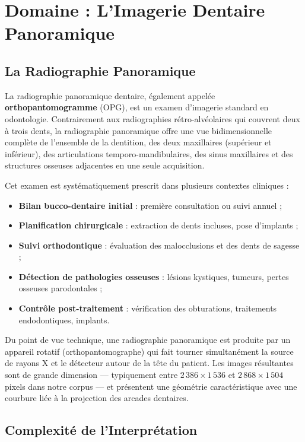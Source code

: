 \documentclass{rapportENSIAS}
\begin{document}
\section{Domaine : L'Imagerie Dentaire Panoramique}

\subsection{La Radiographie Panoramique}

La radiographie panoramique dentaire, également appelée \textbf{orthopantomogramme} (OPG), est un examen d'imagerie standard en odontologie. Contrairement aux radiographies rétro-alvéolaires qui couvrent deux à trois dents, la radiographie panoramique offre une vue bidimensionnelle complète de l'ensemble de la dentition, des deux maxillaires (supérieur et inférieur), des articulations temporo-mandibulaires, des sinus maxillaires et des structures osseuses adjacentes en une seule acquisition.

Cet examen est systématiquement prescrit dans plusieurs contextes cliniques :
\begin{itemize}
    \item \textbf{Bilan bucco-dentaire initial} : première consultation ou suivi annuel ;
    \item \textbf{Planification chirurgicale} : extraction de dents incluses, pose d'implants ;
    \item \textbf{Suivi orthodontique} : évaluation des malocclusions et des dents de sagesse ;
    \item \textbf{Détection de pathologies osseuses} : lésions kystiques, tumeurs, pertes osseuses parodontales ;
    \item \textbf{Contrôle post-traitement} : vérification des obturations, traitements endodontiques, implants.
\end{itemize}

Du point de vue technique, une radiographie panoramique est produite par un appareil rotatif (orthopantomographe) qui fait tourner simultanément la source de rayons X et le détecteur autour de la tête du patient. Les images résultantes sont de grande dimension — typiquement entre $2\,386 \times 1\,536$ et $2\,868 \times 1\,504$ pixels dans notre corpus — et présentent une géométrie caractéristique avec une courbure liée à la projection des arcades dentaires.

\subsection{Complexité de l'Interprétation}
\end{document}
